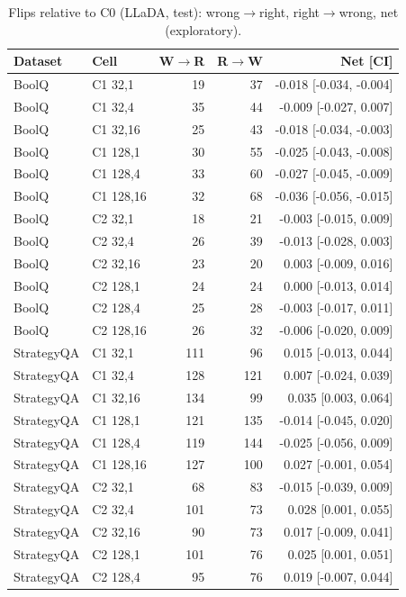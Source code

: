\begin{table}[h!]
\centering
\scriptsize
\caption{Flips relative to C0 (LLaDA, test): wrong$\to$right, right$\to$wrong, net (exploratory).}
\label{tab:flips}
\begin{tabular}{llrrr}
\toprule
Dataset & Cell & W$\to$R & R$\to$W & Net [CI] \\
\midrule
BoolQ & C1 32,1 & 19 & 37 & -0.018 [-0.034, -0.004] \\
BoolQ & C1 32,4 & 35 & 44 & -0.009 [-0.027, 0.007] \\
BoolQ & C1 32,16 & 25 & 43 & -0.018 [-0.034, -0.003] \\
BoolQ & C1 128,1 & 30 & 55 & -0.025 [-0.043, -0.008] \\
BoolQ & C1 128,4 & 33 & 60 & -0.027 [-0.045, -0.009] \\
BoolQ & C1 128,16 & 32 & 68 & -0.036 [-0.056, -0.015] \\
BoolQ & C2 32,1 & 18 & 21 & -0.003 [-0.015, 0.009] \\
BoolQ & C2 32,4 & 26 & 39 & -0.013 [-0.028, 0.003] \\
BoolQ & C2 32,16 & 23 & 20 & 0.003 [-0.009, 0.016] \\
BoolQ & C2 128,1 & 24 & 24 & 0.000 [-0.013, 0.014] \\
BoolQ & C2 128,4 & 25 & 28 & -0.003 [-0.017, 0.011] \\
BoolQ & C2 128,16 & 26 & 32 & -0.006 [-0.020, 0.009] \\
StrategyQA & C1 32,1 & 111 & 96 & 0.015 [-0.013, 0.044] \\
StrategyQA & C1 32,4 & 128 & 121 & 0.007 [-0.024, 0.039] \\
StrategyQA & C1 32,16 & 134 & 99 & 0.035 [0.003, 0.064] \\
StrategyQA & C1 128,1 & 121 & 135 & -0.014 [-0.045, 0.020] \\
StrategyQA & C1 128,4 & 119 & 144 & -0.025 [-0.056, 0.009] \\
StrategyQA & C1 128,16 & 127 & 100 & 0.027 [-0.001, 0.054] \\
StrategyQA & C2 32,1 & 68 & 83 & -0.015 [-0.039, 0.009] \\
StrategyQA & C2 32,4 & 101 & 73 & 0.028 [0.001, 0.055] \\
StrategyQA & C2 32,16 & 90 & 73 & 0.017 [-0.009, 0.041] \\
StrategyQA & C2 128,1 & 101 & 76 & 0.025 [0.001, 0.051] \\
StrategyQA & C2 128,4 & 95 & 76 & 0.019 [-0.007, 0.044] \\

\end{tabular}
\end{table}
